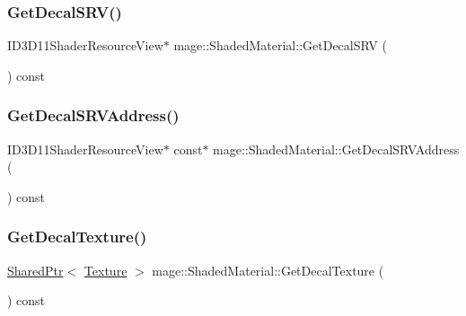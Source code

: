 \subsubsection{\texorpdfstring{Get\+Decal\+S\+R\+V()}{GetDecalSRV()}}
{\footnotesize\ttfamily I\+D3\+D11\+Shader\+Resource\+View$\ast$ mage\+::\+Shaded\+Material\+::\+Get\+Decal\+S\+RV (\begin{DoxyParamCaption}{ }\end{DoxyParamCaption}) const\hspace{0.3cm}{\ttfamily [noexcept]}}

\hypertarget{structmage_1_1_shaded_material_ac6bd86176058b7fdeb4c9a7823ff8c71}{}\label{structmage_1_1_shaded_material_ac6bd86176058b7fdeb4c9a7823ff8c71} 
\subsubsection{\texorpdfstring{Get\+Decal\+S\+R\+V\+Address()}{GetDecalSRVAddress()}}
{\footnotesize\ttfamily I\+D3\+D11\+Shader\+Resource\+View$\ast$ const$\ast$ mage\+::\+Shaded\+Material\+::\+Get\+Decal\+S\+R\+V\+Address (\begin{DoxyParamCaption}{ }\end{DoxyParamCaption}) const\hspace{0.3cm}{\ttfamily [noexcept]}}

\hypertarget{structmage_1_1_shaded_material_affd31417050c3fa426791fa521c03fc9}{}\label{structmage_1_1_shaded_material_affd31417050c3fa426791fa521c03fc9} 
\subsubsection{\texorpdfstring{Get\+Decal\+Texture()}{GetDecalTexture()}}
{\footnotesize\ttfamily \hyperlink{namespacemage_a1e01ae66713838a7a67d30e44c67703e}{Shared\+Ptr}$<$ \hyperlink{classmage_1_1_texture}{Texture} $>$ mage\+::\+Shaded\+Material\+::\+Get\+Decal\+Texture (\begin{DoxyParamCaption}{ }\end{DoxyParamCaption}) const\hspace{0.3cm}{\ttfamily [noexcept]}}

